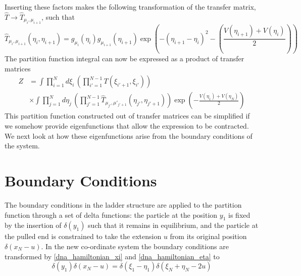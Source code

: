 %
Inserting these factors makes the following transformation of the transfer matrix, $\hat{T} \to \hat{T}_{\mu_{i},\mu_{i+1}}$, such that
%
\begin{equation}
\label{dna_t_hat_matrix}
\hat{T}_{\mu_{i},\mu_{i+1}}\left(\eta_{i},\eta_{i+1}\right) = g_{\mu_{i}}\left(\eta_{i}\right)g_{\mu_{i+1}}\left(\eta_{i+1}\right) \exp\left(-\left(\eta_{i+1}-\eta_{i}\right)^2 - \left(\frac{V\left(\eta_{i+1}\right)+V\left(\eta_{i}\right)}{2}\right)\right)
\end{equation}
%
The partition function integral can now be expressed as a product of transfer matrices
%
\begin{align}
Z&=\int \prod_{i=1}^{N}d\xi_{i}\,\left(\prod_{i'=1}^{N-1}T\left(\xi_{i'+1},\xi_{i'}\right)\right)\nonumber\\
&\times\int \prod_{j=1}^{N}d\eta_{j}\,\left(\prod_{j'=1}^{N-1}\hat{T}_{\mu_{j'},\mu'_{j'+1}}\left(\eta_{j'},\eta_{j'+1}\right)\right)\exp\left(-\frac{V\left(\eta_{1}\right)+V\left(\eta_{N}\right)}{2}\right)
\end{align}
%
This partition function constructed out of transfer matrices can be simplified if we somehow provide eigenfunctions that allow the expression to be contracted. We next look at how these eigenfunctions arise from the boundary conditions of the system.
%
\section{Boundary Conditions}
%
The boundary conditions in the ladder structure are applied to the partition function through a set of delta functions: the particle at the position $y_{1}$ is fixed by the insertion of $\delta\left(y_{1}\right)$ such that it remains in equilibrium, and the particle at the pulled end is constrained to take the extension $u$ from its original position $\delta\left(x_{N}-u\right)$. In the new co-ordinate system the boundary conditions are transformed by \eqref{dna_hamiltonian_xi} and \eqref{dna_hamiltonian_eta} to
%
\begin{equation}
\delta\left(y_{1}\right)\delta\left(x_{N}-u\right) = \delta\left(\xi_{1}-\eta_{1}\right)\delta\left(\xi_{N}+\eta_{N}-2u\right)
\end{equation}
%
